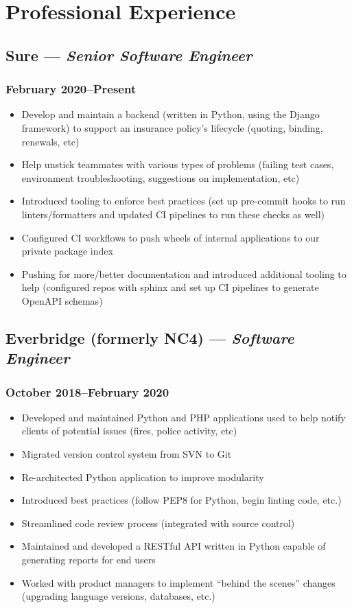 \documentclass{article}
\begin{document}
\begin{minipage}[t]{.6\textwidth}
\section*{Professional Experience}
\subsection*{Sure  --- \textit{Senior Software Engineer}}
\subsubsection*{February 2020--Present}
\begin{itemize}
    \item Develop and maintain a backend (written in Python, using the Django framework) to support an insurance policy's lifecycle (quoting, binding, renewals, etc)
    \item Help unstick teammates with various types of problems (failing test cases, environment troubleshooting, suggestions on implementation, etc)
    \item Introduced tooling to enforce best practices (set up pre-commit hooks to run linters/formatters and updated CI pipelines to run these checks as well)
    \item Configured CI workflows to push wheels of internal applications to our private package index
    \item Pushing for more/better documentation and introduced additional tooling to help (configured repos with sphinx and set up CI pipelines to generate OpenAPI schemas)
\end{itemize}
\subsection*{Everbridge (formerly NC4) --- \textit{Software Engineer}}
\subsubsection*{October 2018--February 2020}
\begin{itemize}
    \item Developed and maintained Python and PHP applications used to help notify clients of potential issues (fires, police activity, etc)
    \item Migrated version control system from SVN to Git
    \item Re-architected Python application to improve modularity
    \item Introduced best practices (follow PEP8 for Python, begin linting code, etc.)
    \item Streamlined code review process (integrated with source control)
    \item Maintained and developed a RESTful API written in Python capable of generating reports for end users
    \item Worked with product managers to implement ``behind the scenes'' changes (upgrading language versions, databases, etc.)
\end{itemize}

\end{minipage}
\end{document}
